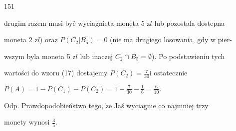 \documentclass[a4paper,12pt]{article}
\begin{document}
151

drugim razem musi byč wyciagnieta moneta 5 $\mathrm{z}l$ lub pozostala dostepna

moneta 2 $\mathrm{z}l$) oraz $P(C_{2}|B_{5}) =0$ (nie ma drugiego losowania, gdy $\mathrm{w}$ pier-

wszym byla moneta 5 $\mathrm{z}l$ lub inaczej $ C_{2}\cap B_{5}=\emptyset$). Po podstawieniu tych

wartości do wzoru (17) dostajemy $P(C_{2})=\displaystyle \frac{7}{30}\mathrm{i}$ ostatecznie

$P(A)=1-P(C_{1})-P(C_{2})=1-\displaystyle \frac{7}{30}-\frac{1}{6}=\frac{6}{10}.$

Odp. Prawdopodobieństwo tego, $\dot{\mathrm{z}}\mathrm{e}$ Jaś wyciagnie co najmniej trzy

monety wynosi $\displaystyle \frac{3}{5}.$
\end{document}
